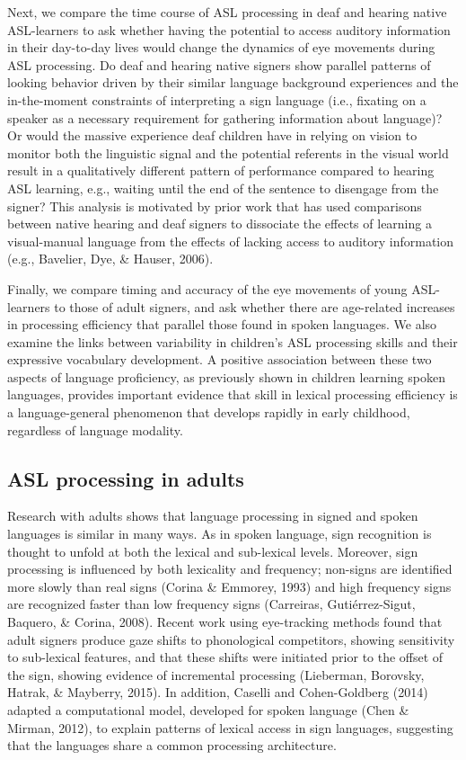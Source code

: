 \documentclass[oneside]{report}
\begin{document}
Next, we compare the time course of ASL processing in deaf and hearing
native ASL-learners to ask whether having the potential to access
auditory information in their day-to-day lives would change the dynamics
of eye movements during ASL processing. Do deaf and hearing native
signers show parallel patterns of looking behavior driven by their
similar language background experiences and the in-the-moment
constraints of interpreting a sign language (i.e., fixating on a speaker
as a necessary requirement for gathering information about language)? Or
would the massive experience deaf children have in relying on vision to
monitor both the linguistic signal and the potential referents in the
visual world result in a qualitatively different pattern of performance
compared to hearing ASL learning, e.g., waiting until the end of the
sentence to disengage from the signer? This analysis is motivated by
prior work that has used comparisons between native hearing and deaf
signers to dissociate the effects of learning a visual-manual language
from the effects of lacking access to auditory information (e.g.,
Bavelier, Dye, \& Hauser, 2006).

Finally, we compare timing and accuracy of the eye movements of young
ASL-learners to those of adult signers, and ask whether there are
age-related increases in processing efficiency that parallel those found
in spoken languages. We also examine the links between variability in
children's ASL processing skills and their expressive vocabulary
development. A positive association between these two aspects of
language proficiency, as previously shown in children learning spoken
languages, provides important evidence that skill in lexical processing
efficiency is a language-general phenomenon that develops rapidly in
early childhood, regardless of language modality.

\subsection{ASL processing in adults}\label{asl-processing-in-adults}

Research with adults shows that language processing in signed and spoken
languages is similar in many ways. As in spoken language, sign
recognition is thought to unfold at both the lexical and sub-lexical
levels. Moreover, sign processing is influenced by both lexicality and
frequency; non-signs are identified more slowly than real signs (Corina
\& Emmorey, 1993) and high frequency signs are recognized faster than
low frequency signs (Carreiras, Gutiérrez-Sigut, Baquero, \& Corina,
2008). Recent work using eye-tracking methods found that adult signers
produce gaze shifts to phonological competitors, showing sensitivity to
sub-lexical features, and that these shifts were initiated prior to the
offset of the sign, showing evidence of incremental processing
(Lieberman, Borovsky, Hatrak, \& Mayberry, 2015). In addition, Caselli
and Cohen-Goldberg (2014) adapted a computational model, developed for
spoken language (Chen \& Mirman, 2012), to explain patterns of lexical
access in sign languages, suggesting that the languages share a common
processing architecture.
\end{document}
